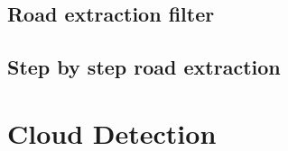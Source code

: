 \subsection{Road extraction filter}



\subsection{Step by step road extraction}




%
% 
%
% 

\section{Cloud Detection}

